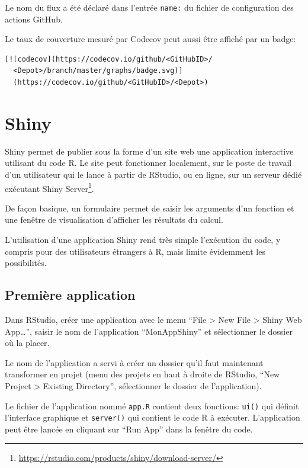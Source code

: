 \documentclass[
  12pt,
  french,
  a4paper,
  extrafontsizes,onecolumn,openright
  ]{memoir}
\newlength{\rf}
\begin{document}
Le nom du flux a été déclaré dans l'entrée \texttt{name:} du fichier de configuration des actions GitHub.

Le taux de couverture mesuré par Codecov peut aussi être affiché par un badge:

\begin{verbatim}
[![codecov](https://codecov.io/github/<GitHubID>/
  <Depot>/branch/master/graphs/badge.svg)]
  (https://codecov.io/github/<GitHubID>/<Depot>)
\end{verbatim}

\hypertarget{chap:shiny}{%
\chapter{Shiny}\label{chap:shiny}}

Shiny permet de publier sous la forme d'un site web une application interactive utilisant du code R.
Le site peut fonctionner localement, sur le poste de travail d'un utilisateur qui le lance à partir de RStudio, ou en ligne, sur un serveur dédié exécutant Shiny Server\footnote{\url{https://rstudio.com/products/shiny/download-server/}}.

De façon basique, un formulaire permet de saisir les arguments d'un fonction et une fenêtre de visualisation d'afficher les résultats du calcul.

L'utilisation d'une application Shiny rend très simple l'exécution du code, y compris pour des utilisateurs étrangers à R, mais limite évidemment les possibilités.

\hypertarget{premiuxe8re-application}{%
\section{Première application}\label{premiuxe8re-application}}

Dans RStudio, créer une application avec le menu \enquote{File \textgreater{} New File \textgreater{} Shiny Web App\ldots{}}, saisir le nom de l'application \enquote{MonAppShiny} et sélectionner le dossier où la placer.

Le nom de l'application a servi à créer un dossier qu'il faut maintenant transformer en projet (menu des projets en haut à droite de RStudio, \enquote{New Project \textgreater{} Existing Directory}, sélectionner le dossier de l'application).

Le fichier de l'application nommé \texttt{app.R} contient deux fonctions: \texttt{ui()} qui définit l'interface graphique et \texttt{server()} qui contient le code R à exécuter.
L'application peut être lancée en cliquant sur \enquote{Run App} dans la fenêtre du code.
\end{document}
